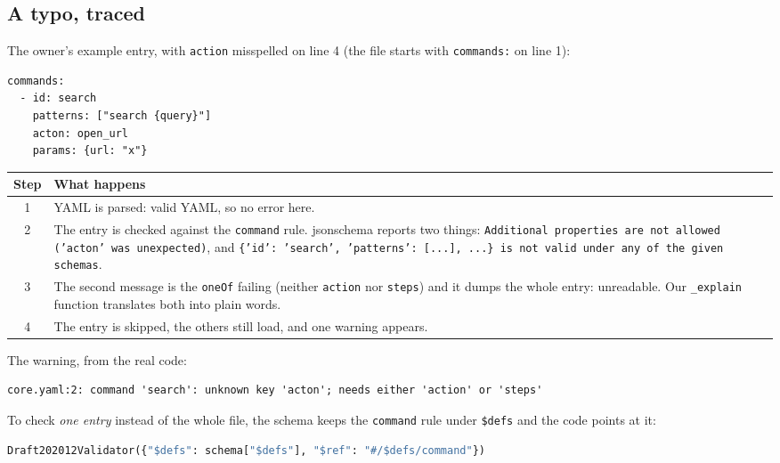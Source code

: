 \documentclass[11pt,a4paper]{article}
\begin{document}
\subsection{A typo, traced}
The owner's example entry, with \texttt{action} misspelled on line 4 (the file starts with
\texttt{commands:} on line 1):
\begin{lstlisting}
commands:
  - id: search
    patterns: ["search {query}"]
    acton: open_url
    params: {url: "x"}
\end{lstlisting}
\begin{center}
\begin{tabularx}{\textwidth}{c X}
\toprule
\textbf{Step} & \textbf{What happens} \\
\midrule
1 & YAML is parsed: valid YAML, so no error here. \\
2 & The entry is checked against the \texttt{command} rule. jsonschema reports two things:
    \texttt{Additional properties are not allowed ('acton' was unexpected)}, and
    \texttt{\{'id': 'search', 'patterns': [...], ...\} is not valid under any of the given
    schemas}. \\
3 & The second message is the \texttt{oneOf} failing (neither \texttt{action} nor
    \texttt{steps}) and it dumps the whole entry: unreadable. Our \texttt{\_explain} function
    translates both into plain words. \\
4 & The entry is skipped, the others still load, and one warning appears. \\
\bottomrule
\end{tabularx}
\end{center}
\noindent The warning, from the real code:
\begin{lstlisting}
core.yaml:2: command 'search': unknown key 'acton'; needs either 'action' or 'steps'
\end{lstlisting}
\noindent To check \emph{one entry} instead of the whole file, the schema keeps the
\texttt{command} rule under \texttt{\$defs} and the code points at it:
\begin{lstlisting}[language=Python]
Draft202012Validator({"$defs": schema["$defs"], "$ref": "#/$defs/command"})
\end{lstlisting}
\end{document}

